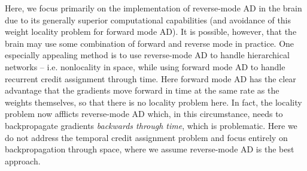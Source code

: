 Here, we focus primarily on the implementation of reverse-mode AD in the brain due to its generally superior computational capabilities (and avoidance of this weight locality problem for forward mode AD). It is possible, however, that the brain may use some combination of forward and reverse mode in practice. One especially appealing method is to use reverse-mode AD to handle hierarchical networks -- i.e. nonlocality in space, while using forward mode AD to handle recurrent credit assignment through time. Here forward mode AD has the clear advantage that the gradients move forward in time at the same rate as the weights themselves, so that there is no locality problem here. In fact, the locality problem now afflicts reverse-mode AD which, in this circumstance, needs to backpropagate gradients \emph{backwards through time}, which is problematic. Here we do not address the temporal credit assignment problem and focus entirely on backpropagation through space, where we assume reverse-mode AD is the best approach.

